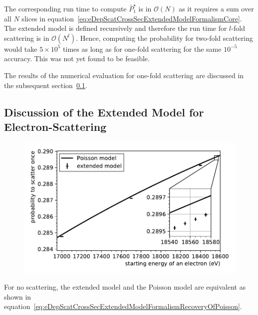 The corresponding run time to compute $\bar{P}^{\star}_1$ is in $\mathcal{O}(N)$ as it requires a sum over all $N$ slices in equation~\eqref{eq:eDepScatCrossSecExtendedModelFormalismCore}. The extended model is defined recursively and therefore the run time for $l$-fold scattering is in $\mathcal{O}(N^l)$. Hence, computing the probability for two-fold scattering would take $5\times10^5$ times as long as for one-fold scattering for the same $10^{-5}$ accuracy. This was not yet found to be feasible.

The results of the numerical evaluation for one-fold scattering are discussed in the subsequent section~\ref{sec:eDepScatCrossSecExtendedModelDiscussion}.
\FloatBarrier

\subsection{Discussion of the Extended Model for Electron-Scattering}
\label{sec:eDepScatCrossSecExtendedModelDiscussion}
\begin{figure}[t]
	\centering
	\includegraphics{chapter/energyDependentCrossSec/fig/scatProbs1PoissonAndExtended.pdf}
	\label{fig:eDepScatCrossSecExtendedModelResults}
\end{figure}
For no scattering, the extended model and the Poisson model are equivalent as shown in equation~\eqref{eq:eDepScatCrossSecExtendedModelFormalismRecoveryOfPoisson}.

